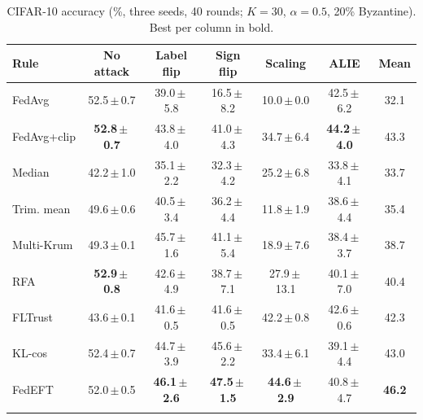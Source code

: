 \begin{table}[!tbp]
\centering
\caption{CIFAR-10 accuracy (\%, three seeds, 40 rounds; $K=30$, $\alpha=0.5$, 20\% Byzantine). Best per column in bold.}
\label{tab:main_cifar}
\setlength{\tabcolsep}{3.0pt}
\footnotesize
\begin{tabular}{@{}lcccccc@{}}
\toprule
Rule & No attack & Label flip & Sign flip & Scaling & ALIE & \textbf{Mean}\\
\midrule
FedAvg & 52.5\,$\pm$\,0.7 & 39.0\,$\pm$\,5.8 & 16.5\,$\pm$\,8.2 & 10.0\,$\pm$\,0.0 & 42.5\,$\pm$\,6.2 & 32.1\\
FedAvg+clip & \textbf{52.8\,$\pm$\,0.7} & 43.8\,$\pm$\,4.0 & 41.0\,$\pm$\,4.3 & 34.7\,$\pm$\,6.4 & \textbf{44.2\,$\pm$\,4.0} & 43.3\\
Median & 42.2\,$\pm$\,1.0 & 35.1\,$\pm$\,2.2 & 32.3\,$\pm$\,4.2 & 25.2\,$\pm$\,6.8 & 33.8\,$\pm$\,4.1 & 33.7\\
Trim. mean & 49.6\,$\pm$\,0.6 & 40.5\,$\pm$\,3.4 & 36.2\,$\pm$\,4.4 & 11.8\,$\pm$\,1.9 & 38.6\,$\pm$\,4.4 & 35.4\\
Multi-Krum & 49.3\,$\pm$\,0.1 & 45.7\,$\pm$\,1.6 & 41.1\,$\pm$\,5.4 & 18.9\,$\pm$\,7.6 & 38.4\,$\pm$\,3.7 & 38.7\\
RFA & \textbf{52.9\,$\pm$\,0.8} & 42.6\,$\pm$\,4.9 & 38.7\,$\pm$\,7.1 & 27.9\,$\pm$\,13.1 & 40.1\,$\pm$\,7.0 & 40.4\\
FLTrust & 43.6\,$\pm$\,0.1 & 41.6\,$\pm$\,0.5 & 41.6\,$\pm$\,0.5 & 42.2\,$\pm$\,0.8 & 42.6\,$\pm$\,0.6 & 42.3\\
KL-cos & 52.4\,$\pm$\,0.7 & 44.7\,$\pm$\,3.9 & 45.6\,$\pm$\,2.2 & 33.4\,$\pm$\,6.1 & 39.1\,$\pm$\,4.4 & 43.0\\
\midrule
FedEFT & 52.0\,$\pm$\,0.5 & \textbf{46.1\,$\pm$\,2.6} & \textbf{47.5\,$\pm$\,1.5} & \textbf{44.6\,$\pm$\,2.9} & 40.8\,$\pm$\,4.7 & \textbf{46.2}\\
\botrule
\end{tabular}
\end{table}

